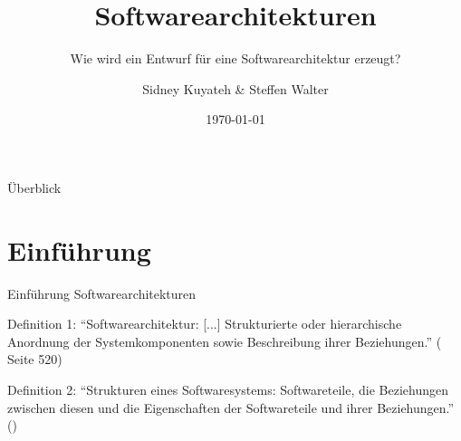 \documentclass{beamer}
\title{Softwarearchitekturen}
\subtitle{Wie wird ein Entwurf für eine Softwarearchitektur erzeugt?}
\author{Sidney Kuyateh \& Steffen Walter}
\institute{Duale Hochschule Baden-Württemberg}
\date{\today}
\begin{document}
	\maketitle
	\begin{frame}{Überblick}
		\tableofcontents
	\end{frame}
		\section{Einführung}
		\begin{frame}{Einführung Softwarearchitekturen}
			\begin{block}{Definition 1:}
				\enquote{Softwarearchitektur: [...] Strukturierte oder hierarchische Anordnung der Systemkomponenten sowie Beschreibung ihrer Beziehungen.} (\cite{balzert} Seite 520)
			\end{block}
			\begin{block}{Definition 2:}
				\enquote{Strukturen eines Softwaresystems: Softwareteile, die Beziehungen zwischen diesen und die Eigenschaften der Softwareteile und ihrer Beziehungen.} (\cite{clements})
			\end{block}
		\end{frame}
\end{document}
